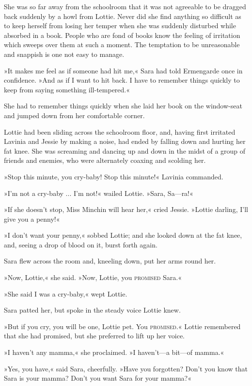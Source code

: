 She was so far away from the schoolroom that it was not agreeable to be dragged back suddenly by a howl from Lottie. Never did she find anything so difficult as to keep herself from losing her temper when she was suddenly disturbed while absorbed in a book. People who are fond of books know the feeling of irritation which sweeps over them at such a moment. The temptation to be unreasonable and snappish is one not easy to manage.

»It makes me feel as if someone had hit me,« Sara had told Ermengarde once in confidence. »And as if I want to hit back. I have to remember things quickly to keep from saying something ill-tempered.«

She had to remember things quickly when she laid her book on the window-seat and jumped down from her comfortable corner.

Lottie had been sliding across the schoolroom floor, and, having first irritated Lavinia and Jessie by making a noise, had ended by falling down and hurting her fat knee. She was screaming and dancing up and down in the midst of a group of friends and enemies, who were alternately coaxing and scolding her.

»Stop this minute, you cry-baby! Stop this minute!« Lavinia commanded.

»I'm not a cry-baby ... I'm not!« wailed Lottie. »Sara, Sa—ra!«

»If she doesn't stop, Miss Minchin will hear her,« cried Jessie. »Lottie darling, I'll give you a penny!«

»I don't want your penny,« sobbed Lottie; and she looked down at the fat knee, and, seeing a drop of blood on it, burst forth again.

Sara flew across the room and, kneeling down, put her arms round her.

»Now, Lottie,« she said. »Now, Lottie, you \textsc{promised} Sara.«

»She said I was a cry-baby,« wept Lottie.

Sara patted her, but spoke in the steady voice Lottie knew.

»But if you cry, you will be one, Lottie pet. You \textsc{promised}.« Lottie remembered that she had promised, but she preferred to lift up her voice.

»I haven't any mamma,« she proclaimed. »I haven't—a bit—of mamma.«

»Yes, you have,« said Sara, cheerfully. »Have you forgotten? Don't you know that Sara is your mamma? Don't you want Sara for your mamma?«

